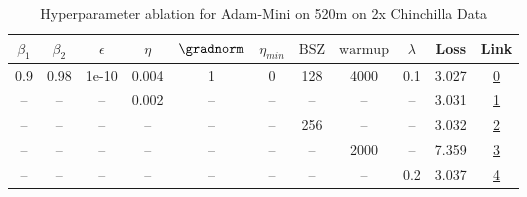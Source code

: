 \begin{table}[H]
\centering
\caption{Hyperparameter ablation for Adam-Mini on 520m on 2x Chinchilla Data}
\label{tab:ablation_adam-mini_520m_on_2x_chinchilla_data}
\begin{tabular}{ccccccccccc}
\toprule
$\beta_1$ & $\beta_2$ & $\epsilon$ & $\eta$ & $\gradnorm$ & $\eta_{min}$ & $\mathrm{BSZ}$ & $\mathrm{warmup}$ & $\lambda$ & Loss & Link \\
\midrule
0.9 & 0.98 & 1e-10 & 0.004 & 1 & 0 & 128 & 4000 & 0.1 & 3.027 & \href{https://wandb.ai/stanford-mercury/optimizer-scaling/runs/sweep-520m-21B-mini4e584elr0.004-wd0.1-minlr0-warmup4000-b10.9-b-eceb71}{0} \\
\midrule
-- & -- & -- & 0.002 & -- & -- & -- & -- & -- & 3.031 & \href{https://wandb.ai/stanford-mercury/optimizer-scaling/runs/sweep-520m-21B-mini3dba17lr0.002-wd0.1-minlr0-warmup4000-b10.9-b-557d40}{1} \\
-- & -- & -- & -- & -- & -- & 256 & -- & -- & 3.032 & \href{https://wandb.ai/stanford-mercury/optimizer-scaling/runs/sweep-520m-21B-mini89512clr0.004-wd0.1-minlr0-warmup4000-b10.9-b-66cd27}{2} \\
-- & -- & -- & -- & -- & -- & -- & 2000 & -- & 7.359 & \href{https://wandb.ai/stanford-mercury/optimizer-scaling/runs/sweep-520m-21B-mini5c5f85lr0.004-wd0.1-minlr0-warmup2000-b10.9-b-9ff993}{3} \\
-- & -- & -- & -- & -- & -- & -- & -- & 0.2 & 3.037 & \href{https://wandb.ai/stanford-mercury/optimizer-scaling/runs/sweep-520m-21B-miniqbb0854lr0.004-wd0.2-minlr0-warmup4000-b10.9--8a1042}{4} \\
\bottomrule
\end{tabular}
\end{table}


